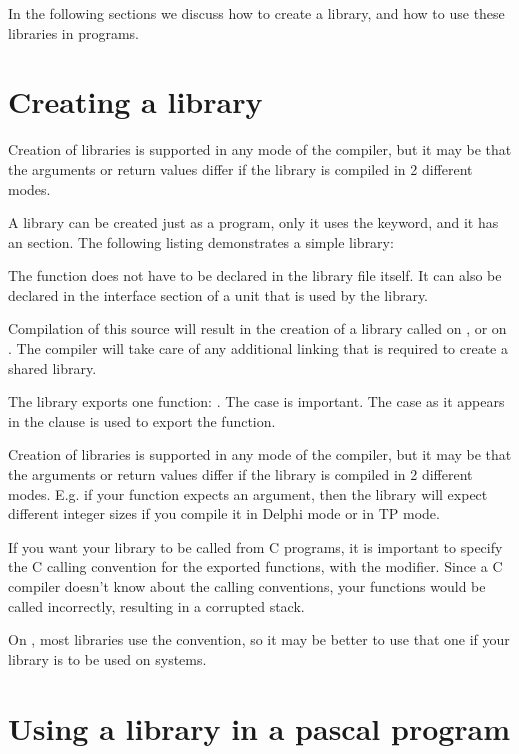 In the following sections we discuss how to create a library, and how
to use these libraries in programs.

\section{Creating a library}

Creation of libraries is supported in any mode of the \fpc compiler,
but it may be that the arguments or return values differ if the library is
compiled in 2 different modes.

A library can be created just as a program, only it uses the 
keyword, and it has an  section. The following listing
demonstrates a simple library:


The function  does not have to be declared in the library file
itself. It can also be declared in the interface section of a unit that
is used by the library.

Compilation of this source will result in the creation of a library called
 on \linux, or  on \windows. The compiler
will take care of any additional linking that is required to create a
shared library.

The library exports one function: . The case is important. The
case as it appears in the  clause is used to export the
function.

Creation of libraries is supported in any mode of the \fpc compiler,
but it may be that the arguments or return values differ if the library is
compiled in 2 different modes.  E.g. if your function expects an
 argument, then the library will expect different integer
sizes if you compile it in Delphi mode or in TP mode.

If you want your library to be called from C programs, it is important to
specify the C calling convention for the exported functions, with the
 modifier. Since a C compiler doesn't know about the \fpc
calling conventions, your functions would be called incorrectly, resulting
in a corrupted stack.

On \windows, most libraries use the  convention, so it may be
better to use that one if your library is to be used on \windows systems.

\section{Using a library in a pascal program}

